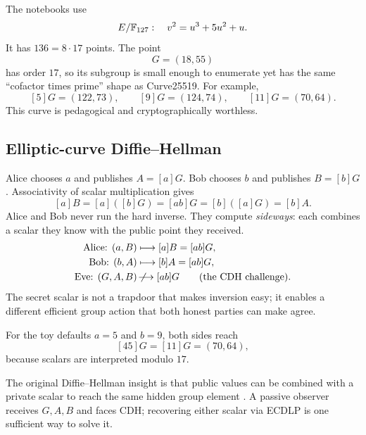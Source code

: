 The notebooks use
\[
  E/\mathbb{F}_{127}:\quad v^2=u^3+5u^2+u.
\]
It has $136=8\cdot17$ points. The point
\[
  G=(18,55)
\]
has order $17$, so its subgroup is small enough to enumerate yet has the same
``cofactor times prime'' shape as Curve25519. For example,
\[
  [5]G=(122,73),\qquad [9]G=(124,74),\qquad[11]G=(70,64).
\]
This curve is pedagogical and cryptographically worthless.

\subsection{Elliptic-curve Diffie--Hellman}

Alice chooses $a$ and publishes $A=[a]G$. Bob chooses $b$ and publishes
$B=[b]G$. Associativity of scalar multiplication gives
\[
  [a]B=[a]([b]G)=[ab]G=[b]([a]G)=[b]A.
\]
Alice and Bob never run the hard inverse. They compute \emph{sideways}: each
combines a scalar they know with the public point they received.
\[
\begin{aligned}
  \text{Alice: }(a,B)&\longmapsto[a]B=[ab]G,\\
  \text{Bob: }(b,A)&\longmapsto[b]A=[ab]G,\\
  \text{Eve: }(G,A,B)&\mathrel{\not\!\longrightarrow}[ab]G
    \qquad\text{(the CDH challenge).}
\end{aligned}
\]
The secret scalar is not a trapdoor that makes inversion easy; it enables a
different efficient group action that both honest parties can make agree.

For the toy defaults $a=5$ and $b=9$, both sides reach
\[
  [45]G=[11]G=(70,64),
\]
because scalars are interpreted modulo $17$.

The original Diffie--Hellman insight is that public values can be combined
with a private scalar to reach the same hidden group element
\cite{diffie1976}. A passive observer receives $G,A,B$ and faces CDH; recovering
either scalar via ECDLP is one sufficient way to solve it.
